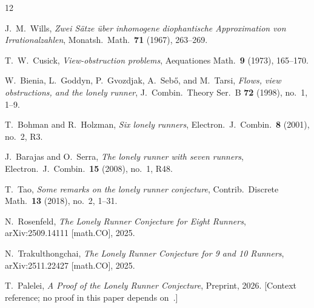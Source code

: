 \documentclass[11pt]{article}
\theoremstyle{definition}
\begin{document}
\begin{thebibliography}{12}

  J.~M.~Wills,
  \textit{Zwei S\"{a}tze \"{u}ber inhomogene diophantische Approximation
    von Irrationalzahlen},
  Monatsh.\ Math.\ \textbf{71} (1967), 263--269.

  T.~W.~Cusick,
  \textit{View-obstruction problems},
  Aequationes Math.\ \textbf{9} (1973), 165--170.

  W.~Bienia, L.~Goddyn, P.~Gvozdjak, A.~Seb{\H{o}}, and M.~Tarsi,
  \textit{Flows, view obstructions, and the lonely runner},
  J.\ Combin.\ Theory Ser.\ B \textbf{72} (1998), no.~1, 1--9.

  T.~Bohman and R.~Holzman,
  \textit{Six lonely runners},
  Electron.\ J.\ Combin.\ \textbf{8} (2001), no.~2, R3.

  J.~Barajas and O.~Serra,
  \textit{The lonely runner with seven runners},
  Electron.\ J.\ Combin.\ \textbf{15} (2008), no.~1, R48.

  T.~Tao,
  \textit{Some remarks on the lonely runner conjecture},
  Contrib.\ Discrete Math.\ \textbf{13} (2018), no.~2, 1--31.

  N.~Rosenfeld,
  \textit{The Lonely Runner Conjecture for Eight Runners},
  arXiv:2509.14111 [math.CO], 2025.

  N.~Trakulthongchai,
  \textit{The Lonely Runner Conjecture for 9 and 10 Runners},
  arXiv:2511.22427 [math.CO], 2025.

  T.~Palelei,
  \textit{A Proof of the Lonely Runner Conjecture},
  Preprint, 2026.
  [Context reference; no proof in this paper depends on~\cite{Pal26}.]

\end{thebibliography}
\end{document}
